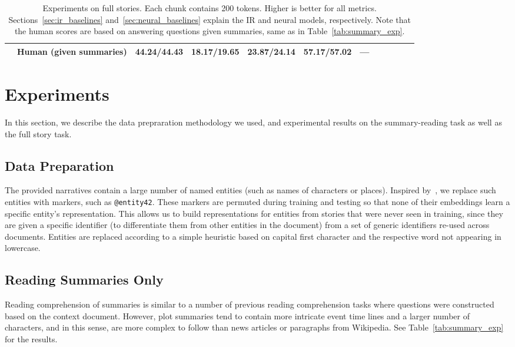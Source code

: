 \documentclass[11pt,letterpaper]{article}
\begin{document}
\begin{table*}
\begin{tabular}{lp{5.5cm}cccccccccc}
    \midrule
    & Human (given summaries)                & 44.24/44.43 & 18.17/19.65 & 23.87/24.14 & 57.17/57.02 & ---   \\
    \bottomrule
\end{tabular}
\caption{Experiments on full stories. Each chunk contains 200 tokens. Higher is better for all metrics.
Sections~\ref{sec:ir_baselines} and~\ref{sec:neural_baselines} explain the IR and neural models, respectively. Note that the human scores are based on answering questions given summaries, same as in Table~\ref{tab:summary_exp}.
}
\label{tab:story_exp}
\end{table*}
 

\section{Experiments}
\label{sec:experiments}
In this section, we describe the data prepraration methodology we used, and experimental results on the summary-reading task as well as the full story task.


\subsection{Data Preparation}
The provided narratives contain a large number of named entities (such as names of characters or places). Inspired by~, we replace such entities with markers, such as \texttt{@entity42}. These markers are permuted during training and testing so that none of their embeddings learn a specific entity's representation. This allows us to build representations for entities from stories that were never seen in training, since they are given a specific identifier (to differentiate them from other entities in the document) from a set of generic identifiers re-used across documents. Entities are replaced according to a simple heuristic based on capital first character and the respective word not appearing in lowercase. 

\subsection{Reading Summaries Only}


Reading comprehension of summaries is similar to a number of previous reading comprehension tasks where questions were constructed based on the context document.
However, plot summaries tend to contain more intricate event time lines and a larger number of characters, and in this sense, are more complex to follow than news articles or paragraphs from Wikipedia.
See Table~\ref{tab:summary_exp} for the results.
\end{document}
